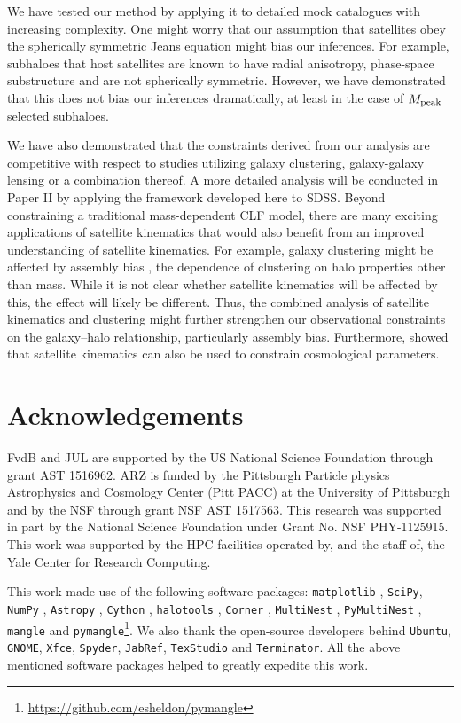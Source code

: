 \documentclass[fleqn,usenatbib,useAMS]{mnras}
\begin{document}
	We have tested our method by applying it to detailed mock catalogues with increasing complexity. One might worry that our assumption that satellites obey the spherically symmetric Jeans equation might bias our inferences. For example, subhaloes that host satellites are known to have radial anisotropy, phase-space substructure and are not spherically symmetric. However, we have demonstrated that this does not bias our inferences dramatically, at least in the case of $M_{\rm peak}$ selected subhaloes.
	
	We have also demonstrated that the constraints derived from our analysis are competitive with respect to studies utilizing galaxy clustering, galaxy-galaxy lensing or a combination thereof. A more detailed analysis will be conducted in Paper II by applying the framework developed here to SDSS. Beyond constraining a traditional mass-dependent CLF model, there are many exciting applications of satellite kinematics that would also benefit from an improved understanding of satellite kinematics. For example, galaxy clustering might be affected by assembly bias \citep{Zentner+14, Zentner+16}, the dependence of clustering on halo properties other than mass. While it is not clear whether satellite kinematics will be affected by this, the effect will likely be different. Thus, the combined analysis of satellite kinematics and clustering might further strengthen our observational constraints on the galaxy--halo relationship, particularly assembly bias. Furthermore, \cite{Li+12} showed that satellite kinematics can also be used to constrain cosmological parameters.
	
	\section*{Acknowledgements}
	
	FvdB and JUL are supported by the US National Science Foundation through grant AST 1516962. ARZ is funded by the Pittsburgh Particle physics Astrophysics and Cosmology Center (Pitt PACC) at the University of Pittsburgh and by the NSF through grant NSF AST 1517563. This research was supported in part by the National Science Foundation under Grant No. NSF PHY-1125915.
	This work was supported by the HPC facilities operated by, and the staff of, the Yale Center for Research Computing.
	
	This work made use of the following software packages: \texttt{matplotlib} \citep{Hunter07}, \texttt{SciPy}, \texttt{NumPy} \citep{vdWalt+11}, \texttt{Astropy} \citep{Astropy13}, \texttt{Cython} \citep{Behnel+11}, \texttt{halotools} \citep{Hearin+16}, \texttt{Corner} \citep{Foreman-Mackey+16}, \texttt{MultiNest} \citep{Feroz+08,Feroz+09, Feroz+13}, \texttt{PyMultiNest} \citep{Buchner+14}, \texttt{mangle} \citep{Hamilton+04, Swanson+08} and \texttt{pymangle}\footnote{\url{https://github.com/esheldon/pymangle}}. We also thank the open-source developers behind \texttt{Ubuntu}, \texttt{GNOME}, \texttt{Xfce}, \texttt{Spyder}, \texttt{JabRef}, \texttt{TexStudio} and \texttt{Terminator}. All the above mentioned software packages helped to greatly expedite this work.
	
\end{document}
